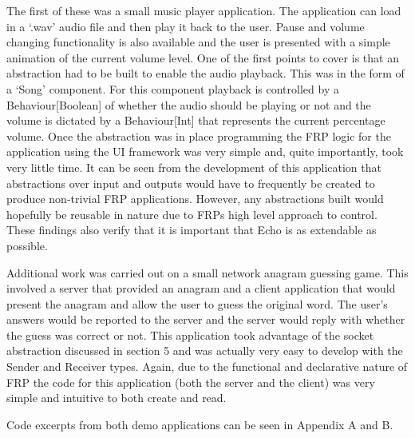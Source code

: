     The first of these was a small music player application. The application
    can load in a `.wav' audio file and then play it back to the user. Pause and volume changing functionality
    is also available and the user is presented with a simple animation of the current volume level. One of the
    first points to cover is that an abstraction had to be built to enable the audio playback. This was in the form
    of a `Song' component. For this component playback is controlled by a Behaviour[Boolean] of whether the audio
    should be playing or not and the volume is dictated by a Behaviour[Int] that represents the current percentage
    volume. Once the abstraction was in place programming the FRP logic for the application using the 
    UI framework was very simple and, quite importantly, took very little time. It can be seen from
    the development of this application that abstractions over input and outputs would have to frequently be
    created to produce non-trivial FRP applications. However, any abstractions built would hopefully be
    reusable in nature due to FRPs high level approach to control. These findings also verify that it
    is important that Echo is as extendable as possible.
    
    Additional work was carried out on a small network anagram guessing game. This involved a server that provided
    an anagram and a client application that would present the anagram and allow the user to guess the original
    word. The user's answers would be reported to the server and the server would reply with whether
    the guess was correct or not. This application took advantage of the socket abstraction discussed in section 5
    and was actually very easy to develop with the Sender and Receiver types. Again, due to the functional and
    declarative nature of FRP the code for this application (both the server and the client) was very simple
    and intuitive to both create and read.
    
    Code excerpts from both demo applications can be seen in Appendix A and B. 